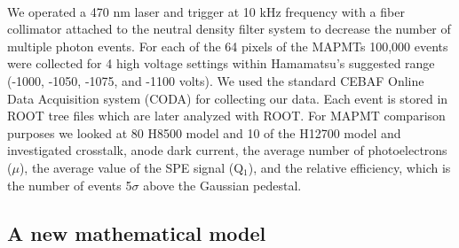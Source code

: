 \documentclass[prc,twocolumn]{revtex4}
\begin{document}
		\\
		\indent We operated a 470 nm laser and trigger at 10 kHz frequency with a fiber collimator attached to the neutral density filter system to decrease the number of multiple photon events.  For each of the 64 pixels of the MAPMTs 100,000 events were collected for 4 high voltage settings within Hamamatsu's suggested range (-1000, -1050, -1075, and -1100 volts).  We used the standard CEBAF Online Data Acquisition system (CODA) for collecting our data. Each event is stored in ROOT tree files which are later analyzed with ROOT. For MAPMT comparison purposes we looked at 80 H8500 model and 10 of the H12700 model and investigated crosstalk, anode dark current, the average number of photoelectrons ($\mu$), the average value of the SPE signal (Q$_1$), and the relative efficiency, which is the number of events 5$\sigma$ above the Gaussian pedestal. 

	\subsection{A new mathematical model}
\end{document}
